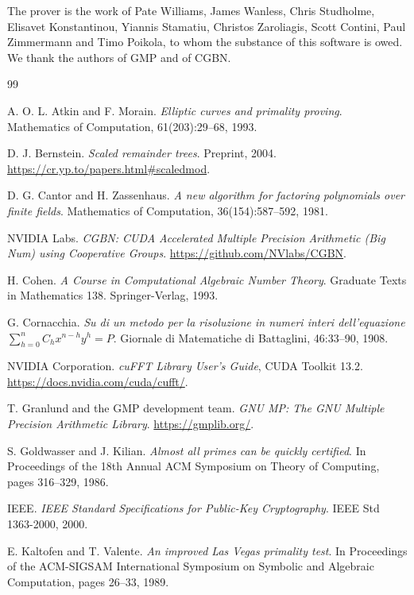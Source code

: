 \documentclass[11pt,a4paper]{article}
\begin{document}
The prover is the work of Pate Williams, James Wanless, Chris Studholme,
Elisavet Konstantinou, Yiannis Stamatiu, Christos Zaroliagis, Scott
Contini, Paul Zimmermann and Timo Poikola, to whom the substance of this
software is owed. We thank the authors of GMP and of CGBN.

\begin{thebibliography}{99}

 A. O. L. Atkin and F. Morain.
  \emph{Elliptic curves and primality proving}.
  Mathematics of Computation, 61(203):29--68, 1993.

 D. J. Bernstein.
  \emph{Scaled remainder trees}. Preprint, 2004.
  \url{https://cr.yp.to/papers.html#scaledmod}.

 D. G. Cantor and H. Zassenhaus.
  \emph{A new algorithm for factoring polynomials over finite fields}.
  Mathematics of Computation, 36(154):587--592, 1981.

 NVIDIA Labs.
  \emph{CGBN: CUDA Accelerated Multiple Precision Arithmetic (Big Num)
  using Cooperative Groups}.
  \url{https://github.com/NVlabs/CGBN}.

 H. Cohen.
  \emph{A Course in Computational Algebraic Number Theory}.
  Graduate Texts in Mathematics 138. Springer-Verlag, 1993.

 G. Cornacchia.
  \emph{Su di un metodo per la risoluzione in numeri interi
  dell'equazione $\sum_{h=0}^{n} C_h x^{n-h} y^h = P$}.
  Giornale di Matematiche di Battaglini, 46:33--90, 1908.

 NVIDIA Corporation.
  \emph{cuFFT Library User's Guide}, CUDA Toolkit 13.2.
  \url{https://docs.nvidia.com/cuda/cufft/}.

 T. Granlund and the GMP development team.
  \emph{GNU MP: The GNU Multiple Precision Arithmetic Library}.
  \url{https://gmplib.org/}.

 S. Goldwasser and J. Kilian.
  \emph{Almost all primes can be quickly certified}.
  In Proceedings of the 18th Annual ACM Symposium on Theory of
  Computing, pages 316--329, 1986.

 IEEE.
  \emph{IEEE Standard Specifications for Public-Key Cryptography}.
  IEEE Std 1363-2000, 2000.

 E. Kaltofen and T. Valente.
  \emph{An improved Las Vegas primality test}.
  In Proceedings of the ACM-SIGSAM International Symposium on Symbolic
  and Algebraic Computation, pages 26--33, 1989.


\end{thebibliography}
\end{document}
